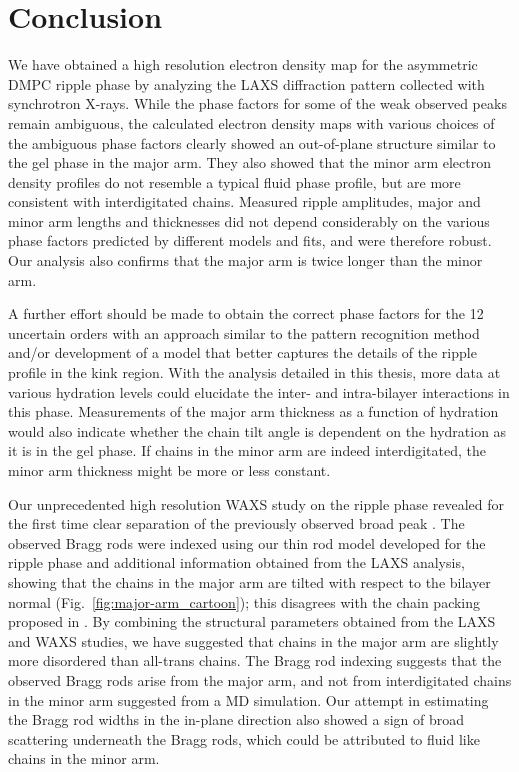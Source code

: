 \section{Conclusion}\label{sec:ripple_conclusion}
We have obtained a high resolution electron density map for the asymmetric
DMPC ripple phase by analyzing the LAXS diffraction pattern collected with
synchrotron X-rays. 
While the phase factors for some of the weak observed peaks
remain ambiguous, the calculated electron density maps with various choices
of the ambiguous phase
factors clearly showed an out-of-plane structure similar to the gel phase
in the major arm. They also showed that the minor arm electron density profiles
do not resemble a typical fluid phase profile, but are more consistent with
interdigitated chains.
Measured ripple amplitudes, major and minor arm lengths and thicknesses
did not depend considerably on the various phase factors predicted by 
different models and fits, and were therefore robust. 
Our analysis also confirms that the major arm is twice longer than the minor arm.

A further effort should be made to obtain the correct phase factors for the 12 uncertain orders
with an approach similar to the pattern recognition method
and/or development of a model that better captures the details of the ripple
profile in the kink region. 
With the analysis detailed in this thesis,
more data at various hydration levels could elucidate the 
inter- and intra-bilayer interactions in this phase.
Measurements of the major arm thickness as a function of hydration
would also indicate whether the chain tilt angle is dependent on the hydration
as it is in the gel phase.
If chains in the minor arm are indeed interdigitated, the minor arm thickness
might be more or less constant.

Our unprecedented high resolution WAXS study on the ripple phase 
revealed for the first time
clear separation of the previously observed broad peak \cite{ref:Katsaras95}.
The observed Bragg rods were indexed using our thin rod model developed 
for the ripple phase and additional information obtained from the LAXS
analysis, showing that the chains in the major arm are 
tilted with respect to the bilayer normal (Fig.~\ref{fig:major-arm_cartoon});
this disagrees with the chain packing proposed in \cite{ref:Sengupta00,ref:Sengupta03}.
By combining the structural parameters obtained from the LAXS and WAXS studies,
we have suggested that chains in the major arm are slightly more 
disordered than all-trans chains.
The Bragg rod indexing suggests that the observed Bragg rods arise 
from the major arm, and not from interdigitated chains 
in the minor arm suggested from a MD simulation.
Our attempt in estimating the Bragg rod widths in the in-plane direction
also showed a sign of broad scattering underneath the Bragg rods,
which could be attributed to fluid like chains in the minor arm.

